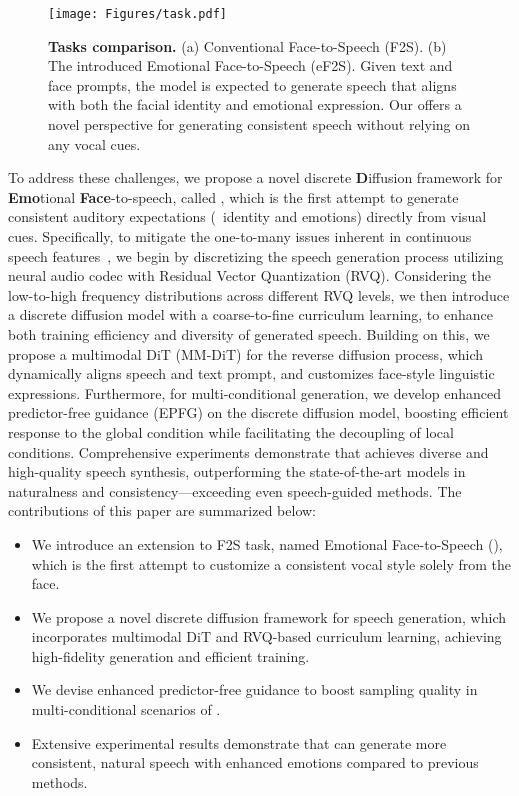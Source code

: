 \begin{figure*}
    \centering
    \texttt{[image: Figures/task.pdf]}
    \caption{
    \textbf{Tasks comparison.} (a) Conventional Face-to-Speech (F2S). (b) The introduced Emotional Face-to-Speech (eF2S). Given text and face prompts, the model is expected to generate speech that aligns with both the facial identity and emotional expression. Our \taskname offers a novel perspective for generating consistent speech without relying on any vocal cues.
    }
    \label{fig:task}
\end{figure*}

To address these challenges, we propose a novel discrete \textbf{D}iffusion framework for \textbf{Emo}tional \textbf{Face}-to-speech, called \textbf{\methodname}, which is the first attempt to generate consistent auditory expectations (\ie~identity and emotions) directly from visual cues. 
Specifically, to mitigate the one-to-many issues inherent in continuous speech features~\cite{foundationTTS:journals/corr/abs-2303-02939}, we begin by discretizing the speech generation process utilizing neural audio codec with Residual Vector Quantization (RVQ). 
Considering the low-to-high frequency distributions across different RVQ  levels, we then introduce a discrete diffusion model with a coarse-to-fine curriculum learning, to enhance both training efficiency and diversity of generated speech. 
Building on this, we propose a multimodal DiT (MM-DiT) for the reverse diffusion process, which dynamically aligns speech and text prompt, and customizes face-style linguistic expressions. 
Furthermore, for multi-conditional generation, we develop enhanced predictor-free guidance (EPFG) on the discrete diffusion model, boosting efficient response to the global condition while facilitating the decoupling of local conditions. 
Comprehensive experiments demonstrate that \methodname achieves diverse and high-quality speech synthesis, outperforming the state-of-the-art models in naturalness and consistency---exceeding even speech-guided methods. 
The contributions of this paper are summarized below:
\begin{itemize}[leftmargin=12pt]
\item We introduce an extension to F2S task, named Emotional Face-to-Speech (\taskname), which is the first attempt to customize a consistent vocal style solely from the face. 
\item We propose a novel discrete diffusion framework for speech generation, which incorporates multimodal DiT and RVQ-based curriculum learning, achieving high-fidelity generation and efficient training. 
\item We devise enhanced predictor-free guidance to boost sampling quality in multi-conditional scenarios of \taskname.
\item Extensive experimental results demonstrate that \methodname can generate more consistent, natural speech with enhanced emotions compared to previous methods.
\end{itemize}

